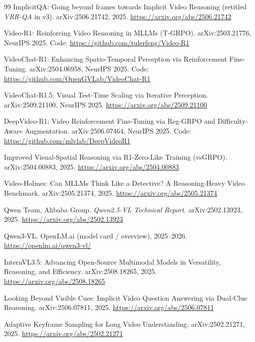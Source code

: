 \documentclass[11pt]{article}
\begin{document}
\begin{thebibliography}{99}
\small
{}
ImplicitQA: Going beyond frames towards Implicit Video Reasoning
(retitled \emph{VRR-QA} in v3). arXiv:2506.21742, 2025.
\url{https://arxiv.org/abs/2506.21742}

Video-R1: Reinforcing Video Reasoning in MLLMs (T-GRPO). arXiv:2503.21776,
NeurIPS 2025. Code: \url{https://github.com/tulerfeng/Video-R1}

VideoChat-R1: Enhancing Spatio-Temporal Perception via Reinforcement Fine-Tuning.
arXiv:2504.06958, NeurIPS 2025. Code: \url{https://github.com/OpenGVLab/VideoChat-R1}

VideoChat-R1.5: Visual Test-Time Scaling via Iterative Perception.
arXiv:2509.21100, NeurIPS 2025. \url{https://arxiv.org/abs/2509.21100}

DeepVideo-R1: Video Reinforcement Fine-Tuning via Reg-GRPO and Difficulty-Aware
Augmentation. arXiv:2506.07464, NeurIPS 2025.
Code: \url{https://github.com/mlvlab/DeepVideoR1}

Improved Visual-Spatial Reasoning via R1-Zero-Like Training (vsGRPO).
arXiv:2504.00883, 2025. \url{https://arxiv.org/abs/2504.00883}

Video-Holmes: Can MLLMs Think Like a Detective? A Reasoning-Heavy Video Benchmark.
arXiv:2505.21374, 2025. \url{https://arxiv.org/abs/2505.21374}

Qwen Team, Alibaba Group. \emph{Qwen2.5-VL Technical Report.} arXiv:2502.13923, 2025.
\url{https://arxiv.org/abs/2502.13923}

Qwen3-VL. OpenLM.ai (model card / overview), 2025--2026.
\url{https://openlm.ai/qwen3-vl/}

InternVL3.5: Advancing Open-Source Multimodal Models in Versatility, Reasoning,
and Efficiency. arXiv:2508.18265, 2025. \url{https://arxiv.org/abs/2508.18265}

Looking Beyond Visible Cues: Implicit Video Question Answering via Dual-Clue
Reasoning. arXiv:2506.07811, 2025. \url{https://arxiv.org/abs/2506.07811}

Adaptive Keyframe Sampling for Long Video Understanding. arXiv:2502.21271, 2025.
\url{https://arxiv.org/abs/2502.21271}

\end{thebibliography}
\end{document}
